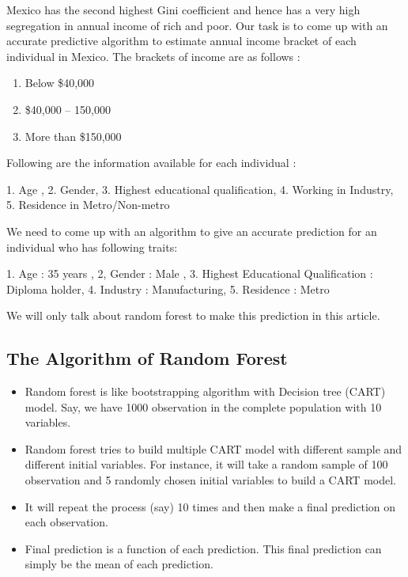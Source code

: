 \documentclass[a4paper,12pt]{article}
\begin{document}

Mexico has the second highest Gini coefficient and hence has a very high segregation in annual income of rich and poor. Our task is to come up with an accurate predictive algorithm to estimate annual income bracket of each individual in Mexico. The brackets of income are as follows :

\begin{enumerate}
	\item Below \$40,000
	
	\item \$40,000 – 150,000
	
	\item More than \$150,000
\end{enumerate}


Following are the information available for each individual :

1. Age , 2. Gender,  3. Highest educational qualification, 4. Working in Industry, 5. Residence in Metro/Non-metro

We need to come up with an algorithm to give an accurate prediction for an individual who has following traits:

1. Age : 35 years , 2, Gender : Male , 3. Highest Educational Qualification : Diploma holder, 4. Industry : Manufacturing, 5. Residence : Metro

We will only talk about random forest to make this prediction in this article.




\subsection*{The Algorithm of Random Forest}

\begin{itemize}
	\item Random forest is like bootstrapping algorithm with Decision tree (CART) model. Say, we have 1000 observation in the complete population with 10 variables.
	\item  Random forest tries to build multiple CART model with different sample and different initial variables. For instance, it will take a random sample of 100 observation and 5 randomly chosen initial variables to build a CART model.
	\item It will repeat the process (say) 10 times and then make a final prediction on each observation. 
	\item Final prediction is a function of each prediction. This final prediction can simply be the mean of each prediction.
	 
\end{itemize}
\end{document}
